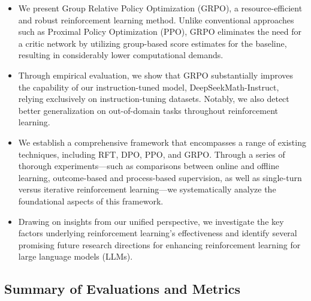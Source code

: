 \begin{itemize}[topsep=0pt]
    \item We present Group Relative Policy Optimization (GRPO), a resource-efficient and robust reinforcement learning method. Unlike conventional approaches such as Proximal Policy Optimization (PPO), GRPO eliminates the need for a critic network by utilizing group-based score estimates for the baseline, resulting in considerably lower computational demands.
    \item Through empirical evaluation, we show that GRPO substantially improves the capability of our instruction-tuned model, DeepSeekMath-Instruct, relying exclusively on instruction-tuning datasets. Notably, we also detect better generalization on out-of-domain tasks throughout reinforcement learning.
    \item We establish a comprehensive framework that encompasses a range of existing techniques, including RFT, DPO, PPO, and GRPO. Through a series of thorough experiments—such as comparisons between online and offline learning, outcome-based and process-based supervision, as well as single-turn versus iterative reinforcement learning—we systematically analyze the foundational aspects of this framework.
    \item Drawing on insights from our unified perspective, we investigate the key factors underlying reinforcement learning’s effectiveness and identify several promising future research directions for enhancing reinforcement learning for large language models (LLMs).
\end{itemize}

\subsection{Summary of Evaluations and Metrics}

